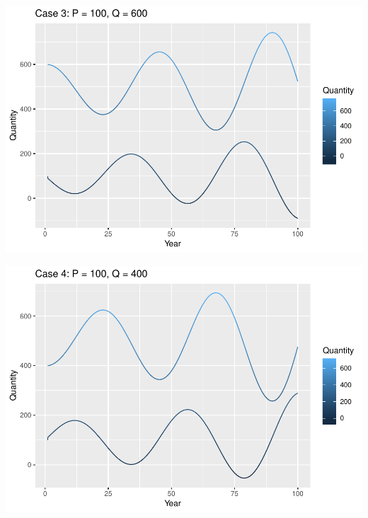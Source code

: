 \documentclass[]{article}
\begin{document}
\includegraphics{DATA_609_Homework_1_files/figure-latex/unnamed-chunk-9-1.pdf}

\includegraphics{DATA_609_Homework_1_files/figure-latex/unnamed-chunk-10-1.pdf}
\end{document}
